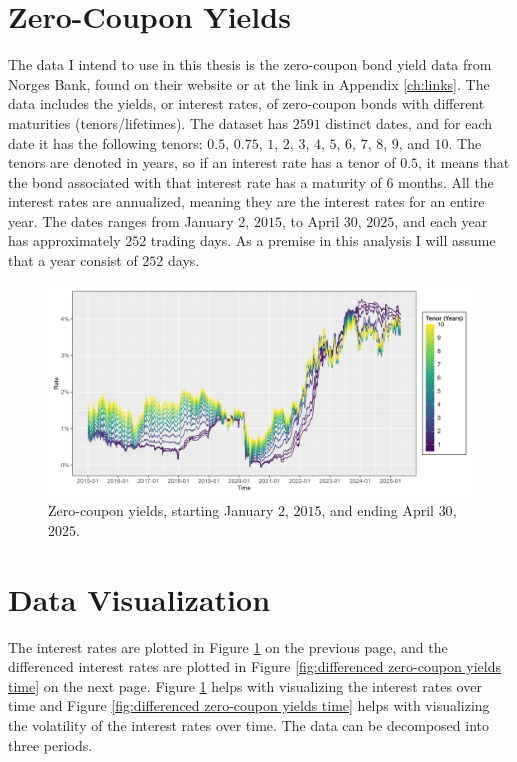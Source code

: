 
\section{Zero-Coupon Yields}

\noindent The data I intend to use in this thesis is the zero-coupon bond yield data from Norges Bank, found on their website or at the link in Appendix \ref{ch:links}. The data includes the yields, or interest rates, of zero-coupon bonds with different maturities (tenors/lifetimes). The dataset has $2591$ distinct dates, and for each date it has the following tenors: $0.5$, $0.75$, $1$, $2$, $3$, $4$, $5$, $6$, $7$, $8$, $9$, and $10$. The tenors are denoted in years, so if an interest rate has a tenor of $0.5$, it means that the bond associated with that interest rate has a maturity of $6$ months. All the interest rates are annualized, meaning they are the interest rates for an entire year. The dates ranges from January $2$, $2015$, to April $30$, $2025$, and each year has approximately $252$ trading days. As a premise in this analysis I will assume that a year consist of $252$ days.



\begin{figure}[H]
    \centering
    \includegraphics[width=.95\linewidth]{Figures/Interest Rates/zero_coupon_yields_dates_time_plot.png}
    \caption[Zero-Coupon Yields]{Zero-coupon yields, starting January $2$, $2015$, and ending April $30$, $2025$.}
    \label{fig:zero-coupon yields time}
\end{figure}

\vfill

\newpage

\section{Data Visualization}

\noindent The interest rates are plotted in Figure \ref{fig:zero-coupon yields time} on the previous page, and the differenced interest rates are plotted in Figure \ref{fig:differenced zero-coupon yields time} on the next page. Figure \ref{fig:zero-coupon yields time} helps with visualizing the interest rates over time and Figure \ref{fig:differenced zero-coupon yields time} helps with visualizing the volatility of the interest rates over time. The data can be decomposed into three periods.

